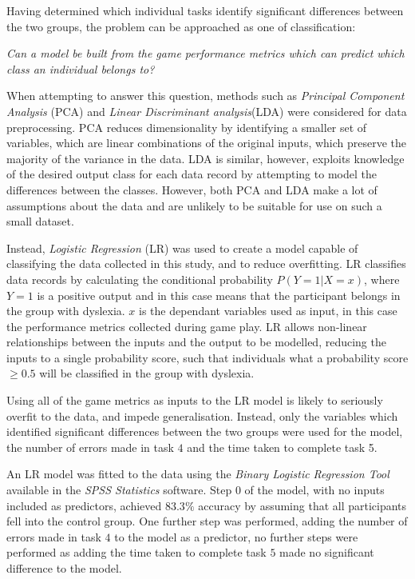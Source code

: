 \documentclass[journal]{IEEEtran}
\newcommand{\cquestion}[1]{\begin{center}
							\textit{#1?}
						\end{center}
					}
\begin{document}
Having determined which individual tasks identify significant differences between the two groups, the problem can be approached as one of classification:
\cquestion{Can a model be built from the game performance metrics which can predict which class an individual belongs to}

When attempting to answer this question, methods such as \emph{Principal Component Analysis} (PCA) and \emph{Linear Discriminant analysis}(LDA) were considered for data preprocessing. 
PCA reduces dimensionality by identifying a smaller set of variables, which are linear combinations of the original inputs,  which preserve the majority of the variance in the data\cite{PCA}.   
LDA is similar, however, exploits knowledge of the desired output class for each data record by attempting to model the differences between the classes.  
However, both PCA and LDA make a lot of assumptions about the data and are unlikely to be suitable for use on such a small dataset. 

Instead, \emph{Logistic Regression} (LR) was used to create a model capable of classifying the data collected in this study, and to reduce overfitting. 
LR classifies data records by calculating the conditional probability  $P(Y=1|X=x)$, where $Y=1$ is a positive output and in this case means that the participant belongs in the group with dyslexia. $x$ is the dependant variables used as input\cite{LR}, in this case the performance metrics collected during game play. LR allows non-linear relationships between the inputs and the output to be modelled, reducing the inputs to a single probability score, such that individuals what a probability score $\geq0.5$ will be classified in the group with dyslexia. 


Using all of the game metrics as inputs to the LR model is likely to seriously overfit to the data, and impede generalisation. Instead, only the variables which identified significant differences between the two groups were used for the model, the number of errors made in task $4$ and the time taken to complete task 5.

An LR model was fitted to the data using the \emph{Binary Logistic Regression Tool} available in the \emph{SPSS Statistics} software. Step 0 of the model, with no inputs included as predictors, achieved $83.3\%$ accuracy by assuming that all participants fell into the control group. One further step was performed, adding the number of errors made in task $4$ to the model as a predictor, no further steps were performed as adding the time taken to complete task $5$ made no significant difference to the model.
\end{document}
